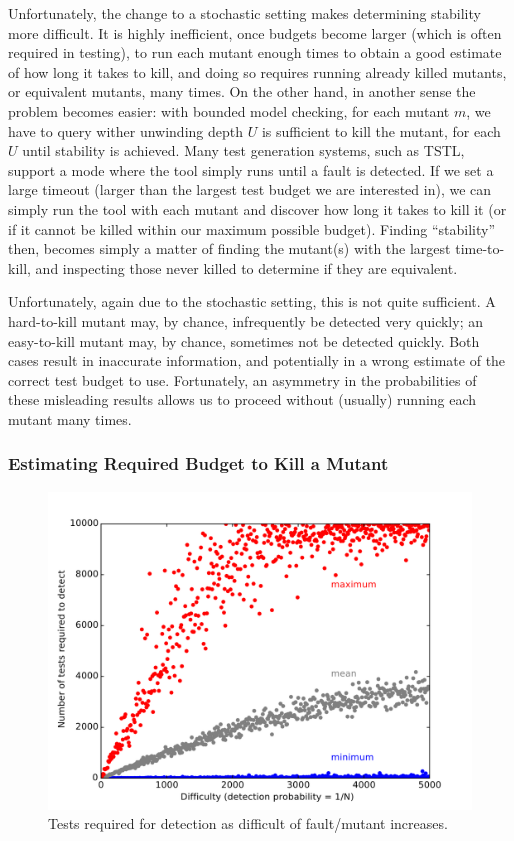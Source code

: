 \documentclass{svjour3}
\begin{document}
Unfortunately, the change to a stochastic setting makes determining
stability more difficult.  It is highly inefficient, once budgets
become larger (which is often required in testing), to run each mutant
enough times to obtain a good estimate of how long it takes to kill,
and doing so requires running already killed mutants, or equivalent
mutants, many times.  On the other hand, in another sense the problem
becomes easier:  with bounded model checking, for each mutant $m$, we have
to query wither unwinding depth $U$ is sufficient to kill the mutant,
for each $U$ until stability is achieved.  Many test generation
systems, such as TSTL, support a mode where the tool simply runs until
a fault is detected.  If we set a large timeout (larger than the
largest test budget we are interested in), we can simply run the tool
with each mutant and discover how long it takes to kill it (or if it
cannot be killed within our maximum possible budget).  Finding
``stability'' then, becomes simply a matter of finding the mutant(s)
with the largest time-to-kill, and inspecting those never killed to
determine if they are equivalent.

Unfortunately, again due to the stochastic setting, this is not quite
sufficient.  A hard-to-kill mutant may, by chance, infrequently be
detected very quickly; an easy-to-kill mutant may, by chance,
sometimes not be detected quickly.  Both cases result in inaccurate
information, and potentially in a wrong estimate of the correct test
budget to use.  Fortunately, an asymmetry in the probabilities of
these misleading results allows us to proceed without (usually) running each
mutant many times.

\subsubsection{Estimating Required Budget to Kill a Mutant}


\begin{figure}
\includegraphics[width=\columnwidth]{probsmodel}
\caption{Tests required for detection as difficult of fault/mutant increases.}
\label{fig:probmodel}
\end{figure}
\end{document}
